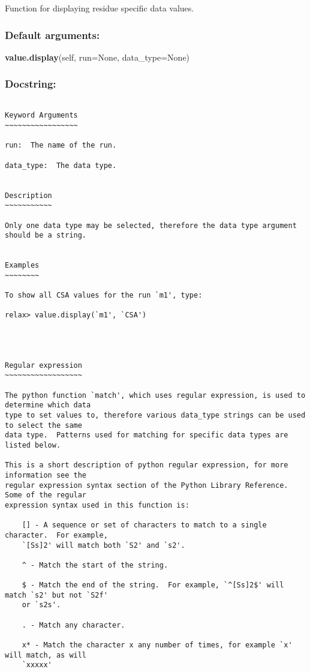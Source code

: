 Function for displaying residue specific data values.

\subsubsection{Default arguments:}

\textsf{\textbf{value.display}(self, run=None, data\_type=None)
}


\subsubsection{Docstring:}

{\scriptsize
\begin{verbatim}

Keyword Arguments
~~~~~~~~~~~~~~~~~

run:  The name of the run.

data_type:  The data type.


Description
~~~~~~~~~~~

Only one data type may be selected, therefore the data type argument should be a string.


Examples
~~~~~~~~

To show all CSA values for the run `m1', type:

relax> value.display(`m1', `CSA')




Regular expression
~~~~~~~~~~~~~~~~~~

The python function `match', which uses regular expression, is used to determine which data
type to set values to, therefore various data_type strings can be used to select the same
data type.  Patterns used for matching for specific data types are listed below.

This is a short description of python regular expression, for more information see the
regular expression syntax section of the Python Library Reference.  Some of the regular
expression syntax used in this function is:

    [] - A sequence or set of characters to match to a single character.  For example,
    `[Ss]2' will match both `S2' and `s2'.

    ^ - Match the start of the string.

    $ - Match the end of the string.  For example, `^[Ss]2$' will match `s2' but not `S2f'
    or `s2s'.

    . - Match any character.

    x* - Match the character x any number of times, for example `x' will match, as will
    `xxxxx'


\end{verbatim}}
